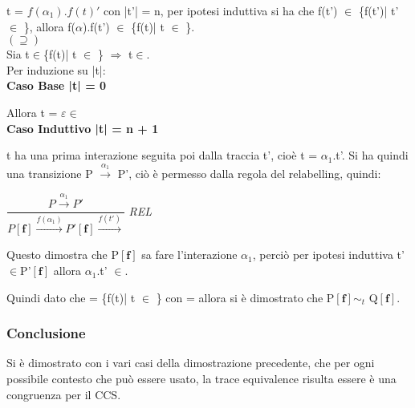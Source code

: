 t = $f(\alpha_{1}).f(t)'$ con |t'| = n, per ipotesi induttiva si ha che f(t') $\in$ \{f(t')| t' $\in$ \}, allora f($\alpha$).f(t') $\in$ \{f(t)| t $\in$ \}.\\

$(\supseteq)$ \\

Sia t$\in$\{f(t)| t $\in$ \}  $\Rightarrow$ t$\in$. \\
Per induzione su |t|:\\

\textbf{Caso Base |t| = 0}

Allora t = $\varepsilon \in$\\

\textbf{Caso Induttivo |t| = n + 1}

t ha una prima interazione seguita poi dalla traccia t', cioè t = $\alpha_{1}$.t'. Si ha quindi una transizione P $\overset{\alpha_{1}}\rightarrow$ P', ciò è permesso dalla regola del relabelling, quindi:

$\dfrac{P \overset{\alpha_{1}}\rightarrow P'}{P \mathbf{[f]} \overset{f(\alpha_{1})}\rightarrow P'\mathbf{[f]}\overset{f(t')}\rightarrow}$ \textit{REL} 

Questo dimostra che P$\mathbf{[f]}$ sa fare l'interazione $\alpha_{1}$, perciò per ipotesi induttiva t'$\in$P'$\mathbf{[f]}$ allora $\alpha_{1}$.t' $\in$.

Quindi dato che  = \{f(t)| t $\in$ \} con  =  allora si è dimostrato che  P$\mathbf{[f]}\sim_{t}$ Q$\mathbf{[f]}$.\\

\subsubsection{Conclusione}
Si è dimostrato con i vari casi della dimostrazione precedente, che per ogni possibile contesto che può essere usato, la trace equivalence risulta essere è una congruenza per il CCS. 
\pagebreak
